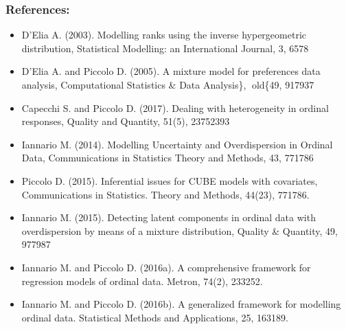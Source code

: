 \documentclass[letterpaper,10pt,english]{sphinxmanual}
\begin{document}
\subsubsection{References:}
\label{\detokenize{cubmods:id246}}\begin{itemize}
\item {} 
\sphinxAtStartPar
D’Elia A. (2003). Modelling ranks using the inverse hypergeometric distribution, Statistical Modelling: an International Journal, 3, 65\textendash{}78

\item {} 
\sphinxAtStartPar
D’Elia A. and Piccolo D. (2005). A mixture model for preferences data analysis, Computational Statistics \& Data Analysis\},  old\{49, 917\textendash{}937

\item {} 
\sphinxAtStartPar
Capecchi S. and Piccolo D. (2017). Dealing with heterogeneity in ordinal responses, Quality and Quantity, 51(5), 2375\textendash{}2393

\item {} 
\sphinxAtStartPar
Iannario M. (2014). Modelling Uncertainty and Overdispersion in Ordinal Data, Communications in Statistics \sphinxhyphen{} Theory and Methods, 43, 771\textendash{}786

\item {} 
\sphinxAtStartPar
Piccolo D. (2015). Inferential issues for CUBE models with covariates, Communications in Statistics. Theory and Methods, 44(23), 771\textendash{}786.

\item {} 
\sphinxAtStartPar
Iannario M. (2015). Detecting latent components in ordinal data with overdispersion by means of a mixture distribution, Quality \& Quantity, 49, 977\textendash{}987

\item {} 
\sphinxAtStartPar
Iannario M. and Piccolo D. (2016a). A comprehensive framework for regression models of ordinal data. Metron, 74(2), 233\textendash{}252.

\item {} 
\sphinxAtStartPar
Iannario M. and Piccolo D. (2016b). A generalized framework for modelling ordinal data. Statistical Methods and Applications, 25, 163\textendash{}189.

\end{itemize}
\end{document}
